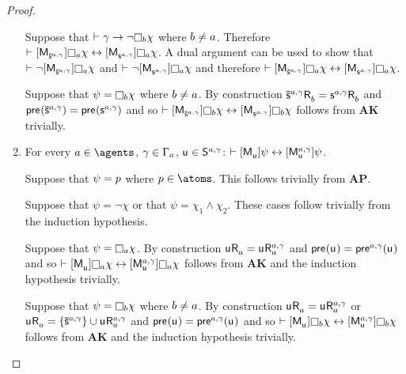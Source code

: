 \begin{proof}
\begin{enumerate}
        Suppose that $\proves \gamma \implies \neg \necessaryB \chi$ where $b \neq a$.
        Therefore $\proves \actionA{\aPModel{\aPStateS[\agentA,\gamma]}} \necessaryA \chi \iff \actionA{\aPModel{\aStateS[\agentA,\gamma]}} \necessaryA \chi$.
        A dual argument can be used to show that $\proves \neg \actionA{\aPModel{\aPStateS[\agentA,\gamma]}} \necessaryA \chi$ and $\proves \neg \actionA{\aPModel{\aStateS[\agentA,\gamma]}} \necessaryA \chi$ and therefore $\proves \actionA{\aPModel{\aPStateS[\agentA,\gamma]}} \necessaryA \chi \iff \actionA{\aPModel{\aStateS[\agentA,\gamma]}} \necessaryA \chi$.

        Suppose that $\psi = \necessaryB \chi$ where $b \neq a$.
        By construction $\aPStateS[\agentA,\gamma] \aAccessibility{\agentB} = \aStateS[\agentA,\gamma] \aAccessibility{\agentB}$ and $\aPrecondition(\aPStateS[\agentA,\gamma]) = \aPrecondition(\aStateS[\agentA,\gamma])$ and so $\proves \actionA{\aPModel{\aPStateS[\agentA,\gamma]}} \necessaryB \chi \iff \actionA{\aPModel{\aStateS[\agentA,\gamma]}} \necessaryB \chi$ follows from {\bf AK} trivially.

    \item For every $\agentA \in \agents$, $\gamma \in \Gamma_a$, $\aStateU \in \aStates[\agentA,\gamma]$: $\proves \actionA{\aPModel{\aStateU}} \psi \iff \actionA{\aPModel[\agentA,\gamma]{\aStateU}} \psi$.

        Suppose that $\psi = p$ where $\atomP \in \atoms$. 
        This follows trivially from {\bf AP}.

        Suppose that $\psi = \neg \chi$ or that $\psi = \chi_1 \land \chi_2$. These cases follow trivially from the induction hypothesis.

        Suppose that $\psi = \necessaryA \chi$.
        By construction $\aStateU \aAccessibility{\agentA} = \aStateU \aAccessibility[\agentA,\gamma]{\agentA}$ and $\aPrecondition(\aStateU) = \aPrecondition[\agentA,\gamma](\aStateU)$ and so $\proves \actionA{\aPModel{\aStateU}} \necessaryA \chi \iff \actionA{\aPModel[\agentA,\gamma]{\aStateU}} \necessaryA \chi$ follows from {\bf AK} and the induction hypothesis trivially.

        Suppose that $\psi = \necessaryB \chi$ where $b \neq a$.
        By construction $\aStateU \aAccessibility{\agentA} = \aStateU \aAccessibility[\agentA,\gamma]{\agentA}$ or $\aStateU \aAccessibility{\agentA} = \{\aPStateS[\agentA,\gamma]\} \cup \aStateU \aAccessibility[\agentA,\gamma]{\agentA}$ and $\aPrecondition(\aStateU) = \aPrecondition[\agentA,\gamma](\aStateU)$ and so $\proves \actionA{\aPModel{\aStateU}} \necessaryB \chi \iff \actionA{\aPModel[\agentA,\gamma]{\aStateU}} \necessaryB \chi$ follows from {\bf AK} and the induction hypothesis trivially.
\end{enumerate}


\end{proof}
